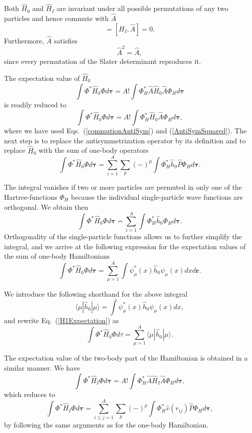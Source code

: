 Both $\hat{H}_0$ and $\hat{H}_I$ are invariant under all possible permutations of any two particles
and hence commute with $\hat{A}$
\begin{equation}
  [H_0,\hat{A}] = [H_I,\hat{A}] = 0. \label{commutionAntiSym}
\end{equation}
Furthermore, $\hat{A}$ satisfies
\begin{equation}
  \hat{A}^2 = \hat{A},  \label{AntiSymSquared}
\end{equation}
since every permutation of the Slater
determinant reproduces it. 

The expectation value of $\hat{H}_0$ 
\[
  \int \Phi^*\hat{H}_0\Phi d\mathbf{\tau} 
  = A! \int \Phi_H^*\hat{A}\hat{H}_0\hat{A}\Phi_H d\mathbf{\tau}
\]
is readily reduced to
\[
  \int \Phi^*\hat{H}_0\Phi d\mathbf{\tau} 
  = A! \int \Phi_H^*\hat{H}_0\hat{A}\Phi_H d\mathbf{\tau},
\]
where we have used Eqs.~(\ref{commutionAntiSym}) and
(\ref{AntiSymSquared}). The next step is to replace the antisymmetrization
operator by its definition and to
replace $\hat{H}_0$ with the sum of one-body operators
\[
  \int \Phi^*\hat{H}_0\Phi  d\mathbf{\tau}
  = \sum_{i=1}^A \sum_{p} (-)^p\int 
  \Phi_H^*\hat{h}_0\hat{P}\Phi_H d\mathbf{\tau}.
\]

The integral vanishes if two or more particles are permuted in only one
of the Hartree-functions $\Phi_H$ because the individual single-particle wave functions are
orthogonal. We obtain then
\[
  \int \Phi^*\hat{H}_0\Phi  d\mathbf{\tau}= \sum_{i=1}^A \int \Phi_H^*\hat{h}_0\Phi_H  d\mathbf{\tau}.
\]
Orthogonality of the single-particle functions allows us to further simplify the integral, and we
arrive at the following expression for the expectation values of the
sum of one-body Hamiltonians 
\begin{equation}
  \int \Phi^*\hat{H}_0\Phi  d\mathbf{\tau}
  = \sum_{\mu=1}^A \int \psi_{\mu}^*(x)\hat{h}_0\psi_{\mu}(x)dx
  d\mathbf{r}.
  \label{H1Expectation}
\end{equation}

We introduce the following shorthand for the above integral
\[
\langle \mu | \hat{h}_0 | \mu \rangle = \int \psi_{\mu}^*(x)\hat{h}_0\psi_{\mu}(x)dx,
\]
and rewrite Eq.~(\ref{H1Expectation}) as
\begin{equation}
  \int \Phi^*\hat{H}_0\Phi  d\tau
  = \sum_{\mu=1}^A \langle \mu | \hat{h}_0 | \mu \rangle.
  \label{H1Expectation1}
\end{equation}

The expectation value of the two-body part of the Hamiltonian is obtained in a
similar manner. We have
\[
  \int \Phi^*\hat{H}_I\Phi d\mathbf{\tau} 
  = A! \int \Phi_H^*\hat{A}\hat{H}_I\hat{A}\Phi_H d\mathbf{\tau},
\]
which reduces to
\[
 \int \Phi^*\hat{H}_I\Phi d\mathbf{\tau} 
  = \sum_{i\le j=1}^A \sum_{p} (-)^p\int 
  \Phi_H^*\hat{v}(r_{ij})\hat{P}\Phi_H d\mathbf{\tau},
\]
by following the same arguments as for the one-body
Hamiltonian. 

